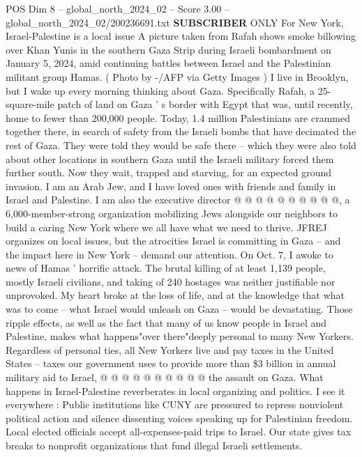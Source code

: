 \begin{textsample}{POS Dim 8 – global\_north\_2024\_02 – Score 3.00 – global\_north\_2024\_02/200236691.txt}  \label{ex:f8_pos_219}
\textbf{SUBSCRIBER} ONLY For New York, Israel-Palestine is a local issue A picture taken from Rafah shows smoke billowing over Khan Yunis in the southern Gaza Strip during Israeli bombardment on January 5, 2024, amid continuing battles between Israel and the Palestinian militant group Hamas. ( Photo by -/AFP via Getty Images ) I live in Brooklyn, but I wake up every morning thinking about Gaza.
Specifically Rafah, a 25-square-mile patch of land on Gaza ' s border with Egypt that was, until recently, home to fewer than 200,000 people.
Today, 1.4 million Palestinians are crammed together there, in search of safety from the Israeli bombs that have decimated the rest of Gaza.
They were told they would be safe there -- which they were also told about other locations in southern Gaza until the Israeli military forced them further south.
Now they wait, trapped and starving, for an expected ground invasion.
I am an Arab Jew, and I have loved ones with friends and family in Israel and Palestine.
I am also the executive director @ @ @ @ @ @ @ @ @ @, a 6,000-member-strong organization mobilizing Jews alongside our neighbors to build a caring New York where we all have what we need to thrive.
JFREJ organizes on local issues, but the atrocities Israel is committing in Gaza -- and the impact here in New York -- demand our attention.
On Oct. 7, I awoke to news of Hamas ' horrific attack.
The brutal killing of at least 1,139 people, mostly Israeli civilians, and taking of 240 hostages was neither justifiable nor unprovoked.
My heart broke at the loss of life, and at the knowledge that what was to come -- what Israel would unleash on Gaza -- would be devastating.
Those ripple effects, as well as the fact that many of us know people in Israel and Palestine, makes what happens"over there"deeply personal to many New Yorkers.
Regardless of personal ties, all New Yorkers live and pay taxes in the United States -- taxes our government uses to provide more than \$3 billion in annual military aid to Israel, @ @ @ @ @ @ @ @ @ @ the assault on Gaza.
What happens in Israel-Palestine reverberates in local organizing and politics.
I see it everywhere : Public institutions like CUNY are pressured to repress nonviolent political action and silence dissenting voices speaking up for Palestinian freedom.
Local elected officials accept all-expenses-paid trips to Israel.
Our state gives tax breaks to nonprofit organizations that fund illegal Israeli settlements.

\end{textsample}
